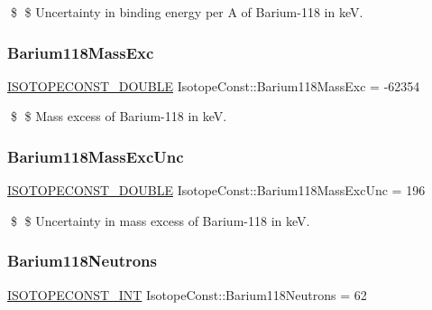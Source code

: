 \$ \$ Uncertainty in binding energy per A of Barium-\/118 in keV. \mbox{\label{group___isotope_const-_barium-_ba118_ga6f44f3f697f4593af40c4b4f8ccb49ec}} 
\subsubsection{\texorpdfstring{Barium118\+Mass\+Exc}{Barium118MassExc}}
{\footnotesize\ttfamily \mbox{\hyperlink{group___isotope_const-_macros_ga8f45a7272ce02c0b4c65c44636ed719a}{I\+S\+O\+T\+O\+P\+E\+C\+O\+N\+S\+T\+\_\+\+D\+O\+U\+B\+LE}} Isotope\+Const\+::\+Barium118\+Mass\+Exc = -\/62354}

\$ \$ Mass excess of Barium-\/118 in keV. \mbox{\label{group___isotope_const-_barium-_ba118_ga584c8bae53923d19de59649e1f77e660}} 
\subsubsection{\texorpdfstring{Barium118\+Mass\+Exc\+Unc}{Barium118MassExcUnc}}
{\footnotesize\ttfamily \mbox{\hyperlink{group___isotope_const-_macros_ga8f45a7272ce02c0b4c65c44636ed719a}{I\+S\+O\+T\+O\+P\+E\+C\+O\+N\+S\+T\+\_\+\+D\+O\+U\+B\+LE}} Isotope\+Const\+::\+Barium118\+Mass\+Exc\+Unc = 196}

\$ \$ Uncertainty in mass excess of Barium-\/118 in keV. \mbox{\label{group___isotope_const-_barium-_ba118_ga893c49f09b2f9ea5fc36ed5687a88718}} 
\subsubsection{\texorpdfstring{Barium118\+Neutrons}{Barium118Neutrons}}
{\footnotesize\ttfamily \mbox{\hyperlink{group___isotope_const-_macros_ga5f18360b3e99483a35c32d789e62621c}{I\+S\+O\+T\+O\+P\+E\+C\+O\+N\+S\+T\+\_\+\+I\+NT}} Isotope\+Const\+::\+Barium118\+Neutrons = 62}


